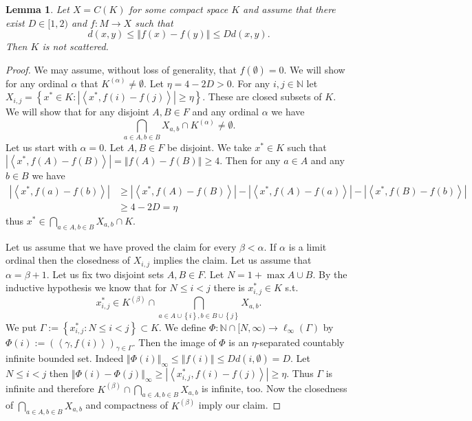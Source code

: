 \documentclass[english,a4paper,12pt]{amsart}
\newcommand{\Natural}{\mathbb N}
\newcommand{\abs}[1]{\left\vert#1\right\vert}
\newcommand{\set}[1]{\left\{#1\right\}}
\newcommand{\norm}[1]{\left\Vert#1\right\Vert}
\newcommand{\duality}[1]{\left\langle#1\right\rangle}
\theoremstyle{plain}
\newtheorem{lem}[thm]{Lemma}
\theoremstyle{definition}
\begin{document}
\begin{lem}\label{l:CK}
Let $X=C(K)$ for some compact space $K$ and assume that there exist $D\in [1,2)$ and $f:M \to X$ such that 
\[
 d(x,y) \leq \norm{f(x)-f(y)}\leq Dd(x,y).
\]
Then $K$ is not scattered.
\end{lem}
\begin{proof}
We may assume, without loss of generality, that $f(\emptyset)=0$. We will show for any ordinal $\alpha$ that $K^{(\alpha)} \neq \emptyset$.
Let $\eta=4-2D>0$.
For any $i,j \in \Natural$ let $X_{i,j}=\set{x^* \in K: \abs{\duality{x^*,f(i)-f(j)}}\geq \eta}$. These are closed subsets of $K$. 
We will show that for any disjoint $A,B \in F$ and any ordinal $\alpha$ we have
\[
 \bigcap_{a \in A,b\in B} X_{a,b} \cap K^{(\alpha)} \neq \emptyset.
\]
Let us start with $\alpha=0$.
Let $A,B \in F$ be disjoint. We take $x^* \in K$ such that $\abs{\duality{x^*,f(A)-f(B)}}=\norm{f(A)-f(B)}\geq 4$.
Then for any $a \in A$ and any $b\in B$ we have
\[
\begin{split}
 \abs{\duality{x^*,f(a)-f(b)}}&\geq \abs{\duality{x^*,f(A)-f(B)}}-\abs{\duality{x^*,f(A)-f(a)}}-\abs{\duality{x^*,f(B)-f(b)}}\\
&\geq 4-2D=\eta
\end{split}
\]
thus $\displaystyle x^* \in \bigcap_{a \in A,b\in B} X_{a,b} \cap K$.

Let us assume that we have proved the claim for every $\beta<\alpha$.
If $\alpha$ is a limit ordinal then the 
closedness of $X_{i,j}$ implies the claim.
Let us assume that $\alpha=\beta+1$.  
Let us fix two disjoint sets $A,B \in F$. Let $N=1+\max A\cup B$.
By the inductive hypothesis we know that for $N\leq i<j$ there is $x^*_{i,j} \in K$ s.t.
\[
 x^*_{i,j}\in K^{(\beta)}\cap \bigcap_{a\in A \cup \set{i} ,b \in B \cup \set{j}} X_{a,b}.
\]
We put $\Gamma:=\set{x^*_{i,j}:N\leq i<j} \subset K$.
We define $\Phi:\Natural \cap [N,\infty) \to \ell_\infty(\Gamma)$ by $\Phi(i):=(\duality{\gamma,f(i)})_{\gamma \in \Gamma}$.
Then the image of $\Phi$ is an $\eta$-separated countably infinite bounded set.
Indeed $\norm{\Phi(i)}_\infty \leq \norm{f(i)} \leq Dd(i,\emptyset)=D$.
Let $N\le i<j$ then $\norm{\Phi(i)-\Phi(j)}_{\infty} \geq \abs{\duality{x^*_{i,j},f(i)-f(j)}}\geq \eta$.
Thus $\Gamma$ is infinite and therefore $\displaystyle K^{(\beta)}\cap \bigcap_{a \in A,b\in B} X_{a,b}$ is infinite, too.
Now the 
closedness of $\displaystyle \bigcap_{a \in A,b\in B} X_{a,b}$ and compactness of $K^{(\beta)}$ imply our claim.
\end{proof}
\end{document}
